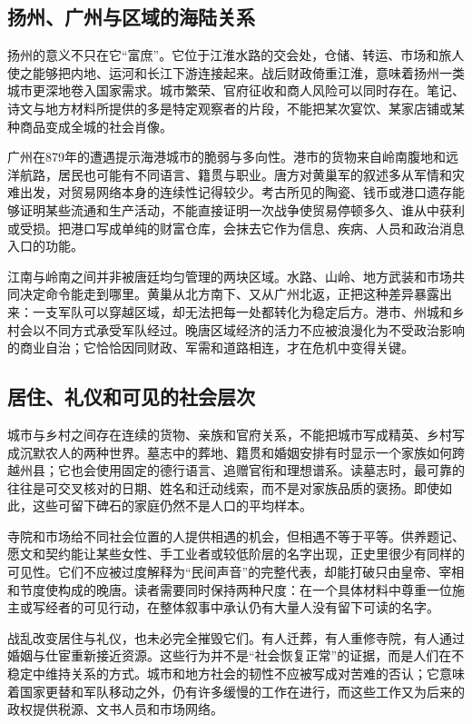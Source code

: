 \subsection{扬州、广州与区域的海陆关系}
扬州的意义不只在它“富庶”。它位于江淮水路的交会处，仓储、转运、市场和旅人使之能够把内地、运河和长江下游连接起来。战后财政倚重江淮，意味着扬州一类城市更深地卷入国家需求。城市繁荣、官府征收和商人风险可以同时存在。笔记、诗文与地方材料所提供的多是特定观察者的片段，不能把某次宴饮、某家店铺或某种商品变成全城的社会肖像。

广州在879年的遭遇提示海港城市的脆弱与多向性。港市的货物来自岭南腹地和远洋航路，居民也可能有不同语言、籍贯与职业。唐方对黄巢军的叙述多从军情和灾难出发，对贸易网络本身的连续性记得较少。考古所见的陶瓷、钱币或港口遗存能够证明某些流通和生产活动，不能直接证明一次战争使贸易停顿多久、谁从中获利或受损。把港口写成单纯的财富仓库，会抹去它作为信息、疾病、人员和政治消息入口的功能。

江南与岭南之间并非被唐廷均匀管理的两块区域。水路、山岭、地方武装和市场共同决定命令能走到哪里。黄巢从北方南下、又从广州北返，正把这种差异暴露出来：一支军队可以穿越区域，却无法把每一处都转化为稳定后方。港市、州城和乡村会以不同方式承受军队经过。晚唐区域经济的活力不应被浪漫化为不受政治影响的商业自治；它恰恰因同财政、军需和道路相连，才在危机中变得关键。

\subsection{居住、礼仪和可见的社会层次}
城市与乡村之间存在连续的货物、亲族和官府关系，不能把城市写成精英、乡村写成沉默农人的两种世界。墓志中的葬地、籍贯和婚姻安排有时显示一个家族如何跨越州县；它也会使用固定的德行语言、追赠官衔和理想谱系。读墓志时，最可靠的往往是可交叉核对的日期、姓名和迁动线索，而不是对家族品质的褒扬。即使如此，这些可留下碑石的家庭仍然不是人口的平均样本。

寺院和市场给不同社会位置的人提供相遇的机会，但相遇不等于平等。供养题记、愿文和契约能让某些女性、手工业者或较低阶层的名字出现，正史里很少有同样的可见性。它们不应被过度解释为“民间声音”的完整代表，却能打破只由皇帝、宰相和节度使构成的晚唐。读者需要同时保持两种尺度：在一个具体材料中尊重一位施主或写经者的可见行动，在整体叙事中承认仍有大量人没有留下可读的名字。

战乱改变居住与礼仪，也未必完全摧毁它们。有人迁葬，有人重修寺院，有人通过婚姻与仕宦重新接近资源。这些行为并不是“社会恢复正常”的证据，而是人们在不稳定中维持关系的方式。城市和地方社会的韧性不应被写成对苦难的否认；它意味着国家更替和军队移动之外，仍有许多缓慢的工作在进行，而这些工作又为后来的政权提供税源、文书人员和市场网络。

